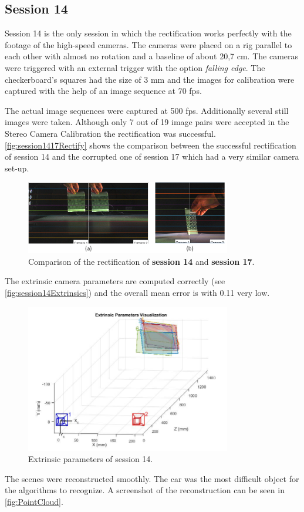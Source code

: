 \subsection{Session 14}\label{ssec:Session14}
Session 14 is the only session in which the rectification works perfectly with the footage of the high-speed cameras. The cameras were placed on a rig parallel to each other with almost no rotation and a baseline of about 20,7 cm. The cameras were triggered with an external trigger with the option \textit{falling edge}. The checkerboard's squares had the size of 3 mm and the images for calibration were captured with the help of an image sequence at 70 fps.

The actual image sequences were captured at 500 fps. Additionally several still images were taken. Although only 7 out of 19 image pairs were accepted in the Stereo Camera Calibration the rectification was successful. \autoref{fig:session1417Rectify} shows the comparison between the successful rectification of session 14 and the corrupted one of session 17 which had a very similar camera set-up.

\begin{figure}[htbp]
		\centering
		\includegraphics[width=0.8\textwidth]{figures/RectifyCompared}
		\caption[Comparison of the rectification of session 14 and 17]{Comparison of the rectification of \textbf{session 14} and \textbf{session 17}.}
		\label{fig:session1417Rectify}
\end{figure}

The extrinsic camera parameters are computed correctly (see \autoref{fig:session14Extrinsics}) and the overall mean error is with 0.11 very low.

\begin{figure}[htbp]
		\centering
		\includegraphics[width=0.8\textwidth]{figures/ExtrinsicParams}
		\caption[Extrinsic parameters of session 14]{Extrinsic parameters of session 14.}
		\label{fig:session14Extrinsics}
\end{figure}

The scenes were reconstructed smoothly. The car was the most difficult object for the algorithms to recognize. A screenshot of the reconstruction can be seen in \autoref{fig:PointCloud}.